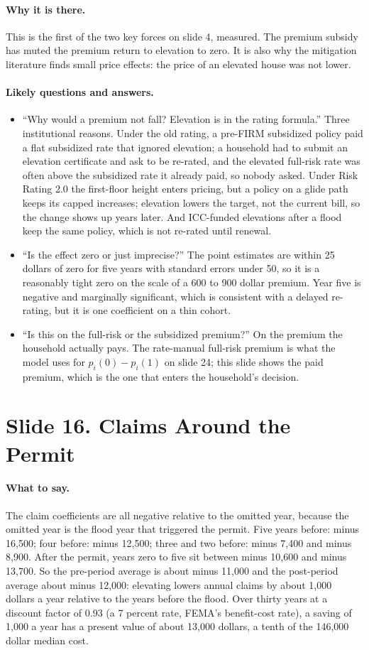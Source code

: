 \documentclass[11pt]{article}
\newcommand{\slide}[2]{\section*{Slide #1. #2}\addcontentsline{toc}{section}{Slide #1. #2}}
\newcommand{\say}{\paragraph{What to say.}}
\newcommand{\why}{\paragraph{Why it is there.}}
\newcommand{\qa}{\paragraph{Likely questions and answers.}}
\begin{document}
\why This is the first of the two key forces on slide 4, measured. The premium subsidy has muted the premium return to elevation to zero. It is also why the mitigation literature finds small price effects: the price of an elevated house was not lower.

\qa
\begin{itemize}
\item ``Why would a premium not fall? Elevation is in the rating formula.'' Three institutional reasons. Under the old rating, a pre-FIRM subsidized policy paid a flat subsidized rate that ignored elevation; a household had to submit an elevation certificate and ask to be re-rated, and the elevated full-risk rate was often above the subsidized rate it already paid, so nobody asked. Under Risk Rating 2.0 the first-floor height enters pricing, but a policy on a glide path keeps its capped increases; elevation lowers the target, not the current bill, so the change shows up years later. And ICC-funded elevations after a flood keep the same policy, which is not re-rated until renewal.
\item ``Is the effect zero or just imprecise?'' The point estimates are within 25 dollars of zero for five years with standard errors under 50, so it is a reasonably tight zero on the scale of a 600 to 900 dollar premium. Year five is negative and marginally significant, which is consistent with a delayed re-rating, but it is one coefficient on a thin cohort.
\item ``Is this on the full-risk or the subsidized premium?'' On the premium the household actually pays. The rate-manual full-risk premium is what the model uses for $p_i(0)-p_i(1)$ on slide 24; this slide shows the paid premium, which is the one that enters the household's decision.
\end{itemize}

\slide{16}{Claims Around the Permit}
\say The claim coefficients are all negative relative to the omitted year, because the omitted year is the flood year that triggered the permit. Five years before: minus 16,500; four before: minus 12,500; three and two before: minus 7,400 and minus 8,900. After the permit, years zero to five sit between minus 10,600 and minus 13,700. So the pre-period average is about minus 11,000 and the post-period average about minus 12,000: elevating lowers annual claims by about 1,000 dollars a year relative to the years before the flood. Over thirty years at a discount factor of 0.93 (a 7 percent rate, FEMA's benefit-cost rate), a saving of 1,000 a year has a present value of about 13,000 dollars, a tenth of the 146,000 dollar median cost.
\end{document}
